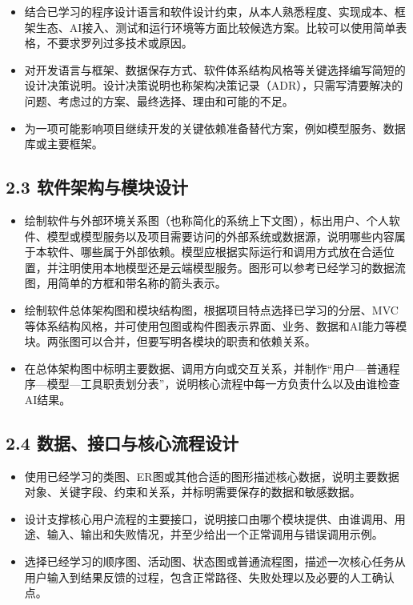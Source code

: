 \documentclass[UTF8,12pt,a4paper]{ctexart}
\begin{document}
\begin{itemize}
  \item 结合已学习的程序设计语言和软件设计约束，从本人熟悉程度、实现成本、框架生态、AI接入、测试和运行环境等方面比较候选方案。比较可以使用简单表格，不要求罗列过多技术或原因。
  \item 对开发语言与框架、数据保存方式、软件体系结构风格等关键选择编写简短的设计决策说明。设计决策说明也称架构决策记录（ADR），只需写清要解决的问题、考虑过的方案、最终选择、理由和可能的不足。
  \item 为一项可能影响项目继续开发的关键依赖准备替代方案，例如模型服务、数据库或主要框架。
\end{itemize}

\subsection*{2.3 软件架构与模块设计}

\begin{itemize}
  \item 绘制软件与外部环境关系图（也称简化的系统上下文图），标出用户、个人软件、模型或模型服务以及项目需要访问的外部系统或数据源，说明哪些内容属于本软件、哪些属于外部依赖。模型应根据实际运行和调用方式放在合适位置，并注明使用本地模型还是云端模型服务。图形可以参考已经学习的数据流图，用简单的方框和带名称的箭头表示。
  \item 绘制软件总体架构图和模块结构图，根据项目特点选择已学习的分层、MVC等体系结构风格，并可使用包图或构件图表示界面、业务、数据和AI能力等模块。两张图可以合并，但要写明各模块的职责和依赖关系。
  \item 在总体架构图中标明主要数据、调用方向或交互关系，并制作“用户—普通程序—模型—工具职责划分表”，说明核心流程中每一方负责什么以及由谁检查AI结果。
\end{itemize}

\subsection*{2.4 数据、接口与核心流程设计}

\begin{itemize}
  \item 使用已经学习的类图、ER图或其他合适的图形描述核心数据，说明主要数据对象、关键字段、约束和关系，并标明需要保存的数据和敏感数据。
  \item 设计支撑核心用户流程的主要接口，说明接口由哪个模块提供、由谁调用、用途、输入、输出和失败情况，并至少给出一个正常调用与错误调用示例。
  \item 选择已经学习的顺序图、活动图、状态图或普通流程图，描述一次核心任务从用户输入到结果反馈的过程，包含正常路径、失败处理以及必要的人工确认点。
\end{itemize}
\end{document}
